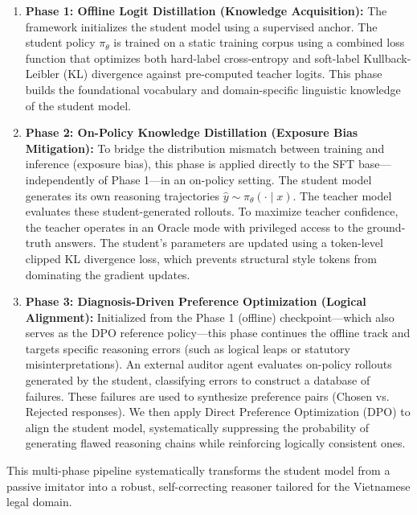 \begin{enumerate}
    \item \textbf{Phase 1: Offline Logit Distillation (Knowledge Acquisition):}
    The framework initializes the student model using a supervised anchor. The student policy $\pi_\theta$ is trained on a static training corpus using a combined loss function that optimizes both hard-label cross-entropy and soft-label Kullback-Leibler (KL) divergence against pre-computed teacher logits. This phase builds the foundational vocabulary and domain-specific linguistic knowledge of the student model.
    
    \item \textbf{Phase 2: On-Policy Knowledge Distillation (Exposure Bias Mitigation):}
    To bridge the distribution mismatch between training and inference (exposure bias), this phase is applied directly to the SFT base---independently of Phase 1---in an on-policy setting. The student model generates its own reasoning trajectories $\hat{y} \sim \pi_\theta(\cdot \mid x)$. The teacher model evaluates these student-generated rollouts. To maximize teacher confidence, the teacher operates in an Oracle mode with privileged access to the ground-truth answers. The student's parameters are updated using a token-level clipped KL divergence loss, which prevents structural style tokens from dominating the gradient updates.
    
    \item \textbf{Phase 3: Diagnosis-Driven Preference Optimization (Logical Alignment):}
    Initialized from the Phase 1 (offline) checkpoint---which also serves as the DPO reference policy---this phase continues the offline track and targets specific reasoning errors (such as logical leaps or statutory misinterpretations). An external auditor agent evaluates on-policy rollouts generated by the student, classifying errors to construct a database of failures. These failures are used to synthesize preference pairs (Chosen vs. Rejected responses). We then apply Direct Preference Optimization (DPO) to align the student model, systematically suppressing the probability of generating flawed reasoning chains while reinforcing logically consistent ones.
\end{enumerate}



This multi-phase pipeline systematically transforms the student model from a passive imitator into a robust, self-correcting reasoner tailored for the Vietnamese legal domain.

